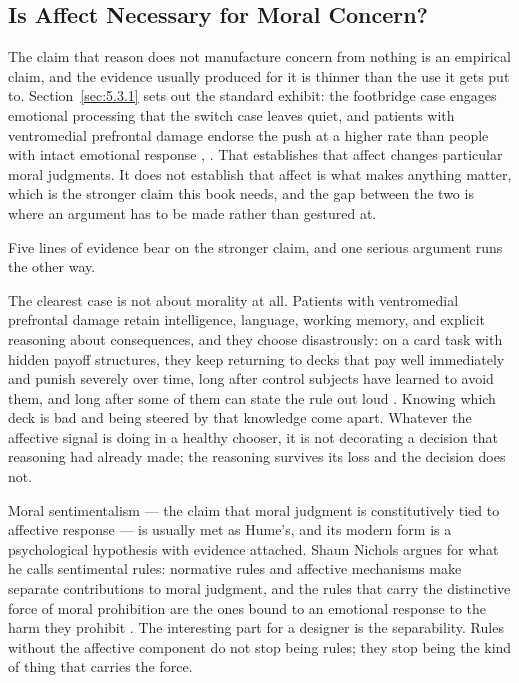 \subsection{Is Affect Necessary for Moral Concern?}
\label{sec:2.3.4}
The claim that reason does not manufacture concern from nothing is an empirical claim, and the evidence usually produced for it is thinner than the use it gets put to. Section~\ref{sec:5.3.1} sets out the standard exhibit: the footbridge case engages emotional processing that the switch case leaves quiet, and patients with ventromedial prefrontal damage endorse the push at a higher rate than people with intact emotional response \autocite{greene2001fmri}, \autocite{koenigs2007damage}. That establishes that affect changes particular moral judgments. It does not establish that affect is what makes anything matter, which is the stronger claim this book needs, and the gap between the two is where an argument has to be made rather than gestured at.

Five lines of evidence bear on the stronger claim, and one serious argument runs the other way.

The clearest case is not about morality at all. Patients with ventromedial prefrontal damage retain intelligence, language, working memory, and explicit reasoning about consequences, and they choose disastrously: on a card task with hidden payoff structures, they keep returning to decks that pay well immediately and punish severely over time, long after control subjects have learned to avoid them, and long after some of them can state the rule out loud \autocite{bechara1994insensitivity}. Knowing which deck is bad and being steered by that knowledge come apart. Whatever the affective signal is doing in a healthy chooser, it is not decorating a decision that reasoning had already made; the reasoning survives its loss and the decision does not.

Moral sentimentalism — the claim that moral judgment is constitutively tied to affective response — is usually met as Hume's, and its modern form is a psychological hypothesis with evidence attached. Shaun Nichols argues for what he calls sentimental rules: normative rules and affective mechanisms make separate contributions to moral judgment, and the rules that carry the distinctive force of moral prohibition are the ones bound to an emotional response to the harm they prohibit \autocite{nichols2004sentimental}. The interesting part for a designer is the separability. Rules without the affective component do not stop being rules; they stop being the kind of thing that carries the force.

